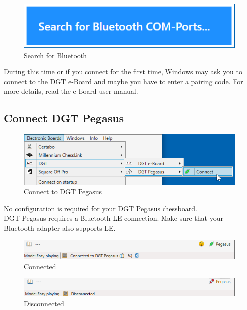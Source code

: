 \documentclass[11pt,a4paper]{article}
\begin{document}
\begin{figure}[H]
	\centering
	\includegraphics[scale=0.8]{MillenniumChessLink10.png}
	\caption{Search for Bluetooth}
	\label{fig:DGTEBoardBT}
\end{figure}

During this time or if you connect for the first time, Windows may ask you to connect to the DGT e-Board and maybe you have to enter a pairing code. For more details, read the e-Board user manual.\\


\subsection{Connect DGT Pegasus} \label{ConfigurePegasus}
\begin{figure}[H]
	\centering
	\includegraphics[scale=0.8]{Pegasus1.png}
	\caption{Connect to DGT Pegasus }
	\label{fig:Pegasus1}
\end{figure}

No configuration is required for your DGT Pegasus chessboard.\\
DGT Pegasus requires a Bluetooth LE connection. Make sure that your Bluetooth adapter also supports LE.

\begin{figure}[H]
	\centering
	\includegraphics[scale=0.8]{Pegasus2.png}
	\caption{Connected}
	\label{fig:Pegasus2}
\end{figure}

\begin{figure}[H]
	\centering
	\includegraphics[scale=0.8]{Pegasus3.png}
	\caption{Disconnected}
	\label{fig:Pegasus3}
\end{figure}
\end{document}
